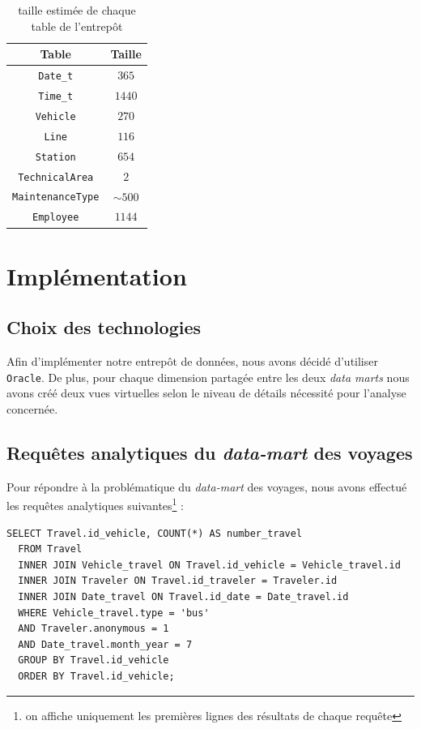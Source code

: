 \documentclass[a4paper,12pt]{report}
\begin{document}
\begin{table}[!ht]
  \centering
  \begin{tabular}{|c|c|}
    \hline
    \textbf{Table} & \textbf{Taille}\\
    \hline
    \texttt{Date\_t} & $365$\\
    \hline
    \texttt{Time\_t} & $1440$\\
    \hline
    \texttt{Vehicle} & $270$\\
    \hline
    \texttt{Line} & $116$\\
    \hline
    \texttt{Station} & $654$\\
    \hline
    \texttt{TechnicalArea} & $2$\\
    \hline
    \texttt{MaintenanceType} & $\sim500$\\
    \hline
    \texttt{Employee} & $1144$\\
    \hline
  \end{tabular}
  \caption{taille estimée de chaque table de l'entrepôt}
\end{table}

\newpage

\chapter{Implémentation}
\section{Choix des technologies}
Afin d'implémenter notre entrepôt de données, nous avons décidé d'utiliser \texttt{Oracle}. De plus, pour chaque dimension partagée entre les deux \textit{data marts} nous avons créé deux vues virtuelles selon le niveau de détails nécessité pour l'analyse concernée.

\section{Requêtes analytiques du \textit{data-mart} des voyages}
Pour répondre à la problématique du \textit{data-mart} des voyages, nous avons effectué les requêtes analytiques suivantes\footnote{on affiche uniquement les premières lignes des résultats de chaque requête} :

\begin{lstlisting}[caption={le nombre de voyages par bus, utilisant des tickets pour le mois de juillet}, label={lst:requ1}]
  SELECT Travel.id_vehicle, COUNT(*) AS number_travel
  FROM Travel
  INNER JOIN Vehicle_travel ON Travel.id_vehicle = Vehicle_travel.id
  INNER JOIN Traveler ON Travel.id_traveler = Traveler.id
  INNER JOIN Date_travel ON Travel.id_date = Date_travel.id
  WHERE Vehicle_travel.type = 'bus'
  AND Traveler.anonymous = 1
  AND Date_travel.month_year = 7
  GROUP BY Travel.id_vehicle
  ORDER BY Travel.id_vehicle;
\end{lstlisting}
\end{document}
